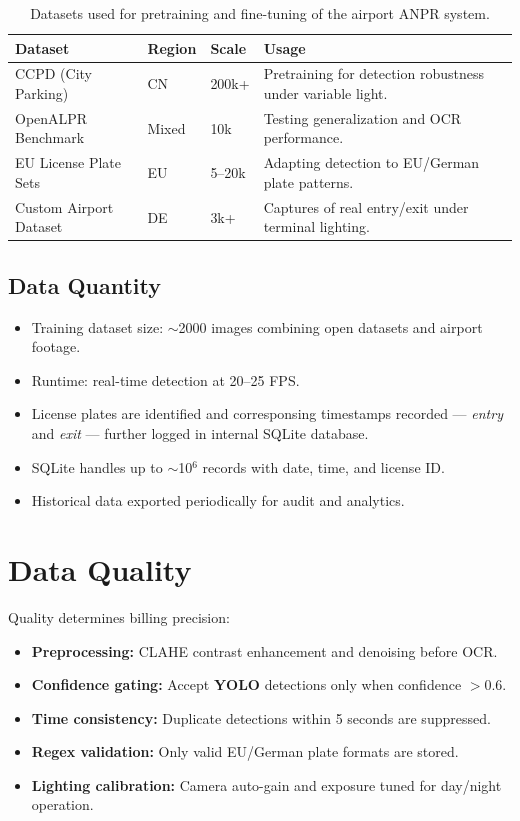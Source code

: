 \begin{table}[h!]
	\centering
	\small
	\begin{tabular}{p{3.5cm} p{2.5cm} p{2.5cm} p{5.5cm}}
		\toprule
		\textbf{Dataset} & \textbf{Region} & \textbf{Scale} & \textbf{Usage} \\
		\midrule
		CCPD (City Parking) & CN & 200k+ & Pretraining for detection robustness under variable light. \\
		OpenALPR Benchmark & Mixed & 10k & Testing generalization and \ac{OCR} performance. \\
		EU License Plate Sets & EU & 5–20k & Adapting detection to EU/German plate patterns. \\
		Custom Airport Dataset & DE & 3k+ & Captures of real entry/exit under terminal lighting. \\
		\bottomrule
	\end{tabular}
	\caption{Datasets used for pretraining and fine-tuning of the airport \ac{ANPR} system.}
	\label{tab:datasets-airport}
\end{table}

\subsection{Data Quantity}
\begin{itemize}
	\item Training dataset size: $\sim$2000 images combining open datasets and airport footage.
	\item Runtime: real-time detection at 20–25 FPS.
	\item License plates are identified and corresponsing timestamps recorded — \emph{entry} and \emph{exit} — further logged in internal SQLite database.
	\item SQLite handles up to $\sim$10$^6$ records with date, time, and license ID.
	\item Historical data exported periodically for audit and analytics.
\end{itemize}

\section{Data Quality}
Quality determines billing precision:
\begin{itemize}
	\item \textbf{Preprocessing:} \ac{CLAHE} contrast enhancement and denoising before \ac{OCR}.
	\item \textbf{Confidence gating:} Accept \textbf{YOLO} detections only when confidence $>0.6$.
	\item \textbf{Time consistency:} Duplicate detections within 5 seconds are suppressed.
	\item \textbf{Regex validation:} Only valid EU/German plate formats are stored.
	\item \textbf{Lighting calibration:} Camera auto-gain and exposure tuned for day/night operation.
\end{itemize}

